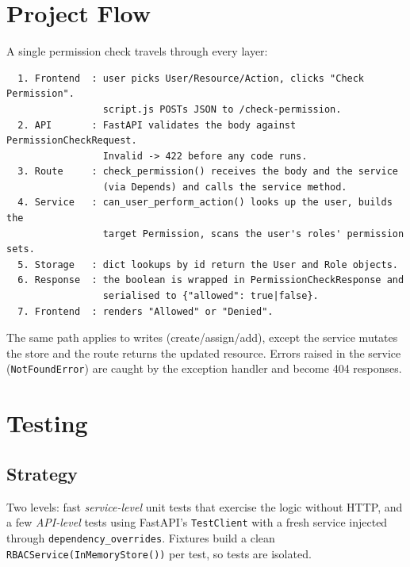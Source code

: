 \documentclass[11pt,a4paper]{report}
\begin{document}
\chapter{Project Flow}

A single permission check travels through every layer:

\begin{verbatim}
  1. Frontend  : user picks User/Resource/Action, clicks "Check Permission".
                 script.js POSTs JSON to /check-permission.
  2. API       : FastAPI validates the body against PermissionCheckRequest.
                 Invalid -> 422 before any code runs.
  3. Route     : check_permission() receives the body and the service
                 (via Depends) and calls the service method.
  4. Service   : can_user_perform_action() looks up the user, builds the
                 target Permission, scans the user's roles' permission sets.
  5. Storage   : dict lookups by id return the User and Role objects.
  6. Response  : the boolean is wrapped in PermissionCheckResponse and
                 serialised to {"allowed": true|false}.
  7. Frontend  : renders "Allowed" or "Denied".
\end{verbatim}

The same path applies to writes (create/assign/add), except the service mutates
the store and the route returns the updated resource. Errors raised in the
service (\texttt{NotFoundError}) are caught by the exception handler and become
404 responses.

\chapter{Testing}

\section{Strategy}
Two levels: fast \emph{service-level} unit tests that exercise the logic without
HTTP, and a few \emph{API-level} tests using FastAPI's \texttt{TestClient} with a
fresh service injected through \texttt{dependency\_overrides}. Fixtures build a
clean \texttt{RBACService(InMemoryStore())} per test, so tests are isolated.
\end{document}
